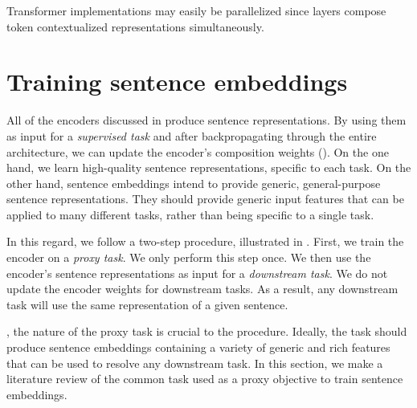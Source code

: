 Transformer implementations may easily be parallelized since layers compose token contextualized representations simultaneously.


\section{Training sentence embeddings}



All of the encoders discussed in  produce sentence representations. By using them as input for a \textit{supervised task} and after backpropagating through the entire architecture, we can update the encoder’s composition weights (). On the one hand, we learn high-quality sentence representations, specific to each task. On the other hand, sentence embeddings intend to provide generic, general-purpose sentence representations. They should provide generic input features that can be applied to many different tasks, rather than being specific to a single task.

In this regard, we follow a two-step procedure, illustrated in . First, we train the encoder on a \textit{proxy task}. We only perform this step once. We then use the encoder's sentence representations as input for a \textit{downstream task}. We do not update the encoder weights for downstream tasks. As a result, any downstream task will use the same representation of a given sentence.

\Certainly, the nature of the proxy task is crucial to the procedure. Ideally, the task should produce sentence embeddings containing a variety of generic and rich features that can be used to resolve any downstream task. In this section, we make a literature review of the common task used as a proxy objective to train sentence embeddings.

